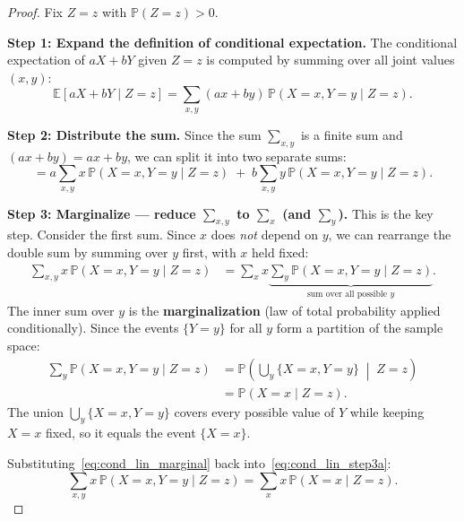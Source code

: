 \documentclass[11pt,a4paper]{article}
\theoremstyle{definition}
\theoremstyle{plain}
\theoremstyle{remark}
\newcommand{\E}{\mathbb{E}}
\newcommand{\Prob}{\mathbb{P}}
\begin{document}
\begin{proof}
Fix $Z = z$ with $\Prob(Z = z) > 0$.

\textbf{Step 1: Expand the definition of conditional expectation.}
The conditional expectation of $aX + bY$ given $Z = z$ is computed by summing over all joint values $(x, y)$:
\begin{equation}
    \E[aX + bY \mid Z = z]
    = \sum_{x,y} (ax + by)\, \Prob(X = x, Y = y \mid Z = z).
    \label{eq:cond_lin_step1}
\end{equation}

\textbf{Step 2: Distribute the sum.}
Since the sum $\sum_{x,y}$ is a finite sum and $(ax + by) = ax + by$, we can split it into two separate sums:
\begin{equation}
    = a \sum_{x,y} x\, \Prob(X = x, Y = y \mid Z = z)
    \;+\; b \sum_{x,y} y\, \Prob(X = x, Y = y \mid Z = z).
    \label{eq:cond_lin_step2}
\end{equation}

\textbf{Step 3: Marginalize --- reduce $\sum_{x,y}$ to $\sum_x$ (and $\sum_y$).}
This is the key step. Consider the first sum. Since $x$ does \emph{not} depend on $y$, we can rearrange the double sum by summing over $y$ first, with $x$ held fixed:
\begin{align}
    \sum_{x,y} x\, \Prob(X = x, Y = y \mid Z = z)
    &= \sum_x x \underbrace{\sum_y \Prob(X = x, Y = y \mid Z = z)}_{\text{sum over all possible } y}.
    \label{eq:cond_lin_step3a}
\end{align}
The inner sum over $y$ is the \textbf{marginalization} (law of total probability applied conditionally). Since the events $\{Y = y\}$ for all $y$ form a partition of the sample space:
\begin{align}
    \sum_y \Prob(X = x, Y = y \mid Z = z)
    &= \Prob\!\left(\bigcup_y \{X = x, Y = y\} \;\middle|\; Z = z\right) \nonumber\\
    &= \Prob(X = x \mid Z = z).
    \label{eq:cond_lin_marginal}
\end{align}
The union $\bigcup_y \{X = x, Y = y\}$ covers every possible value of $Y$ while keeping $X = x$ fixed, so it equals the event $\{X = x\}$.

Substituting~\eqref{eq:cond_lin_marginal} back into~\eqref{eq:cond_lin_step3a}:
\begin{equation}
    \sum_{x,y} x\, \Prob(X = x, Y = y \mid Z = z) = \sum_x x\, \Prob(X = x \mid Z = z).
    \label{eq:cond_lin_step3b}
\end{equation}


\end{proof}
\end{document}
